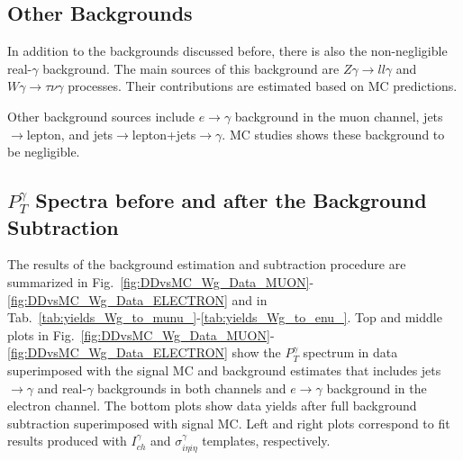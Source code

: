 

\subsection{Other Backgrounds}

In addition to the backgrounds discussed before, there is also the non-negligible real-$\gamma$ background. The main sources of this background are $Z\gamma \rightarrow ll\gamma$ and $W\gamma \rightarrow \tau \nu \gamma$ processes. Their contributions are estimated based on MC predictions. 

Other background sources include $e \rightarrow \gamma$ background in the muon channel, jets$\rightarrow$lepton, and jets$\rightarrow$lepton+jets$\rightarrow\gamma$. MC studies shows these background to be negligible.


\subsection{$P_T^{\gamma}$ Spectra before and after the Background Subtraction}

The results of the background estimation and subtraction procedure are summarized in Fig.~\ref{fig:DDvsMC_Wg_Data_MUON}-\ref{fig:DDvsMC_Wg_Data_ELECTRON} and in Tab.~\ref{tab:yields_Wg_to_munu_}-\ref{tab:yields_Wg_to_enu_}. Top and middle plots in Fig.~\ref{fig:DDvsMC_Wg_Data_MUON}-\ref{fig:DDvsMC_Wg_Data_ELECTRON} show the $P_T^\gamma$ spectrum in data superimposed with the signal MC and background estimates that includes jets$\rightarrow\gamma$ and real-$\gamma$ backgrounds in both channels and $e\rightarrow\gamma$ background in the electron channel. The bottom plots show data yields after full background subtraction superimposed with signal MC. Left and right plots correspond to fit results produced with $I_{ch}^{\gamma}$ and $\sigma_{i\eta i\eta}^{\gamma}$ templates, respectively.

